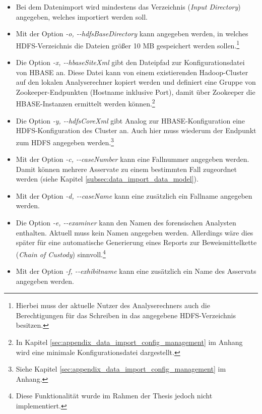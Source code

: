 \begin{itemize}
\item Bei dem Datenimport wird mindestens das Verzeichnis (\textit{Input Directory}) angegeben, welches importiert werden soll.
 
\item Mit der Option \textit{-o, -{}-hdfsBaseDirectory} kann angegeben werden, in welches HDFS-Verzeichnis die Dateien größer 10 MB gespeichert werden sollen.\footnote{Hierbei muss der aktuelle Nutzer des Analyserechners auch die Berechtigungen für das Schreiben in das angegebene HDFS-Verzeichnis besitzen.}

\item Die Option \textit{-x, -{}-hbaseSiteXml} gibt den Dateipfad zur Konfigurationsdatei von HBASE an. Diese Datei kann von einem existierenden Hadoop-Cluster auf den lokalen Analyserechner kopiert werden und definiert eine Gruppe von Zookeeper-Endpunkten (Hostname inklusive Port), damit über Zookeeper die HBASE-Instanzen ermittelt werden können.\footnote{ In Kapitel \ref{sec:appendix_data_import_config_management} im Anhang wird eine minimale Konfigurationsdatei dargestellt.}

\item Die Option \textit{-y, -{}-hdfsCoreXml} gibt Analog zur HBASE-Konfiguration eine HDFS-Konfiguration des Cluster an. Auch hier muss wiederum der Endpunkt zum HDFS angegeben werden.\footnote{Siehe Kapitel \ref{sec:appendix_data_import_config_management} im Anhang.}

\item Mit der Option \textit{-c, -{}-caseNumber} kann eine Fallnummer angegeben werden. Damit können mehrere Asservate zu einem bestimmten Fall zugeordnet werden (siehe Kapitel \ref{subsec:data_import_data_model}).

\item Mit der Option \textit{-d, -{}-caseName} kann eine zusätzlich ein Fallname angegeben werden.

\item Die Option \textit{-e, -{}-examiner} kann den Namen des forensischen Analysten enthalten. Aktuell muss kein Namen angegeben werden. Allerdings wäre dies später für eine automatische Generierung eines Reports zur Beweismittelkette (\textit{Chain of Custody}) sinnvoll.\footnote{Diese Funktionalität wurde im Rahmen der Thesis jedoch nicht implementiert.}

\item Mit der Option \textit{-f, -{}-exhibitname} kann eine zusätzlich ein Name des Asservats angegeben werden.

\end{itemize}

